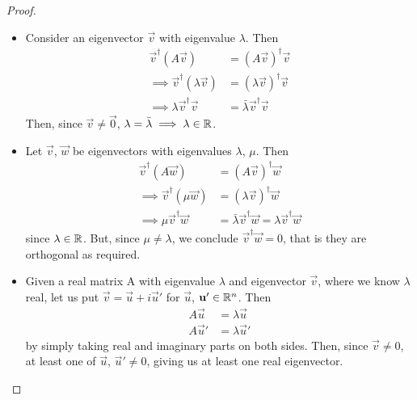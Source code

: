 \documentclass{../../template/note}
\begin{document}
    \begin{proof}
        \begin{itemize}
            \item Consider an eigenvector \(\vec v\) with eigenvalue \(\lambda\). Then
            \begin{align*}
                \vec v^\dagger (A \vec v) &= (A \vec v)^\dagger \vec v \\
                \implies \vec v^\dagger (\lambda \vec v) &= (\lambda \vec v)^\dagger \vec v \\
                \implies \lambda \vec v^\dagger \vec v &= \bar\lambda \vec v^\dagger \vec v
            \end{align*}
            Then, since \(\vec v \neq \vec 0\), \(\lambda = \bar\lambda \implies \lambda \in \mathbb R\).
            \item Let \(\vec v\), \(\vec w\) be eigenvectors with eigenvalues \(\lambda\), \(\mu\). Then
            \begin{align*}
                \vec v^\dagger(A \vec w) &= (A \vec v)^\dagger \vec w \\
                \implies \vec v^\dagger(\mu \vec w) &= (\lambda \vec v)^\dagger \vec w \\
                \implies \mu \vec v^\dagger \vec w &= \bar\lambda \vec v^\dagger \vec w = \lambda \vec v^\dagger \vec w
            \end{align*}
            since \(\lambda \in \mathbb R\). But, since \(\mu \neq \lambda\), we conclude \(\vec v^\dagger \vec w = 0\), that is they are orthogonal as required.
            \item Given a real matrix A with eigenvalue \(\lambda\) and eigenvector \(\vec v\), where we know \(\lambda\) real, let us put \(\vec v = \vec u + i \vec u'\) for \(\vec u\), \(\vec u' \in \RR^n\). Then
            \begin{align*}
                A \vec u &= \lambda \vec u \\
                A \vec u' &= \lambda \vec u'
            \end{align*}
            by simply taking real and imaginary parts on both sides. Then, since \(\vec v \neq 0\), at least one of \(\vec u\), \(\vec u' \neq 0\), giving us at least one real eigenvector.
            
        \end{itemize}
        
        
    \end{proof}

    
\end{document}
